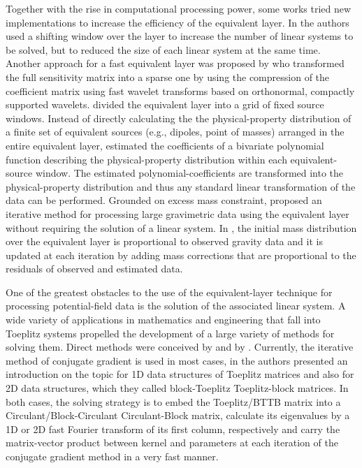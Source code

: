 \documentclass[manuscript]{geophysics}
\begin{document}
Together with the rise in computational processing power, some works tried new implementations to increase the efficiency of the equivalent layer. 
In \cite{leao-silva1989} the authors used a shifting window over the layer to increase the number of linear systems to be solved, but to reduced the size of each linear system at the same time. 
Another approach for a fast equivalent layer was proposed by \cite{li-oldenburg2010}  who transformed the full sensitivity matrix into a sparse one by using  the compression of the coefficient matrix 
using fast wavelet transforms based on orthonormal, compactly supported wavelets.  
\cite{oliveirajr-etal2013} divided the equivalent layer into a grid of fixed source windows.
Instead of directly calculating the the physical-property distribution of a finite set of equivalent
sources (e.g., dipoles, point of masses) arranged in the entire equivalent layer,
\cite{oliveirajr-etal2013} estimated the coefficients of a bivariate polynomial function describing 
the physical-property distribution within each equivalent-source window.
The estimated polynomial-coefficients are transformed into the physical-property distribution
and thus any standard linear transformation of the data can be performed.
Grounded on excess mass constraint, \cite{siqueira-etal2017} proposed an iterative method 
for processing large gravimetric data using the equivalent layer without requiring the solution 
of a linear system. 
In \cite{siqueira-etal2017}, the initial mass distribution over the equivalent layer is
proportional to observed gravity data and it is updated at each iteration by adding mass corrections that are proportional to the residuals of observed and estimated data.

One of the greatest obstacles to the use of the equivalent-layer technique for processing potential-field data is the solution of the associated linear system.
A wide variety of applications in mathematics and engineering that fall into Toeplitz systems propelled the development of a large variety of  methods for solving them. Direct methods were conceived by \cite{levinson1946} and by \cite{trench1964}. Currently, the iterative method of conjugate gradient is used in most cases, in \cite{chan-jin2007} the authors presented an introduction on the topic for 1D data structures of Toeplitz matrices and also for 2D data structures, which they called block-Toeplitz Toeplitz-block matrices. In both cases, the solving strategy is to embed the Toeplitz/BTTB matrix into a Circulant/Block-Circulant Circulant-Block matrix, calculate its eigenvalues by a 1D or 2D fast Fourier transform of its first column, respectively and carry the matrix-vector product between kernel and parameters at each iteration of the conjugate gradient method in a very fast manner.
\end{document}
